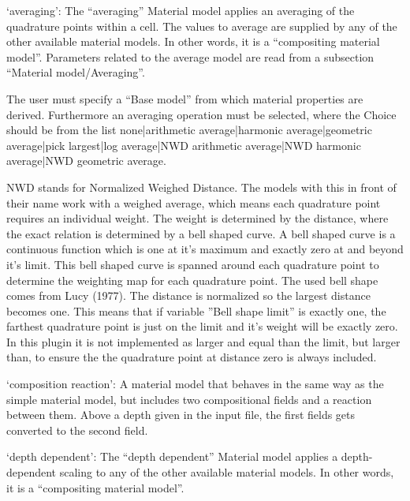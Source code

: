 \begin{itemize}
`averaging': The ``averaging'' Material model applies an averaging of the quadrature points within a cell. The values to average are supplied by any of the other available material models. In other words, it is a ``compositing material model''. Parameters related to the average model are read from a subsection ``Material model/Averaging''. 

The user must specify a ``Base model'' from which material properties are derived. Furthermore an averaging operation must be selected, where the Choice should be from the list none|arithmetic average|harmonic average|geometric average|pick largest|log average|NWD arithmetic average|NWD harmonic average|NWD geometric average. 

NWD stands for Normalized Weighed Distance. The models with this in front of their name work with a weighed average, which means each quadrature point requires an individual weight. The weight is determined by the distance, where the exact relation is determined by a bell shaped curve. A bell shaped curve is a continuous function which is one at it's maximum and exactly zero at and beyond it's limit. This bell shaped curve is spanned around each quadrature point to determine the weighting map for each quadrature point. The used bell shape comes from Lucy (1977). The distance is normalized so the largest distance becomes one. This means that if variable ''Bell shape limit'' is exactly one, the farthest quadrature point is just on the limit and it's weight will be exactly zero. In this plugin it is not implemented as larger and equal than the limit, but larger than, to ensure the the quadrature point at distance zero is always included.

`composition reaction': A material model that behaves in the same way as the simple material model, but includes two compositional fields and a reaction between them. Above a depth given in the input file, the first fields gets converted to the second field. 

`depth dependent': The ``depth dependent'' Material model applies a depth-dependent scaling to any of the other available material models. In other words, it is a ``compositing material model''.


\end{itemize}
